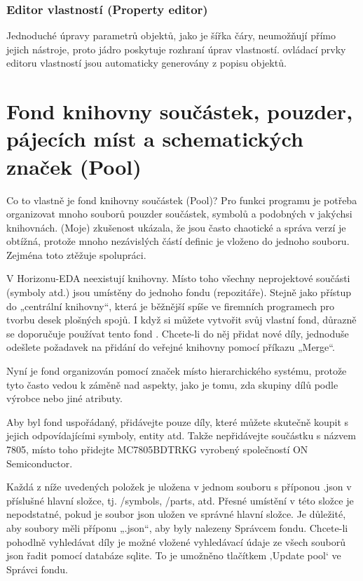 \documentclass[letterpaper,10pt,czech]{sphinxmanual}
\begin{document}
\subsection{Editor vlastností (Property editor)}
\label{\detokenize{theory-of-operation_cz:editor-vlastnosti-property-editor}}
Jednoduché úpravy parametrů objektů, jako je šířka čáry, neumožňují přímo jejich nástroje,
proto jádro poskytuje rozhraní úprav vlastností.
ovládací prvky editoru vlastností jsou automaticky generovány z popisu objektů.


\chapter{Fond knihovny součástek, pouzder, pájecích míst a schematických značek (Pool)}
\label{\detokenize{pool_cz:fond-knihovny-soucastek-pouzder-pajecich-mist-a-schematickych-znacek-pool}}\label{\detokenize{pool_cz::doc}}
Co to vlastně je fond knihovny součástek (Pool)? Pro funkci programu je potřeba organizovat mnoho souborů pouzder součástek, symbolů a podobných v jakýchsi knihovnách. (Moje) zkušenost ukázala, že jsou často chaotické a správa verzí je obtížná, protože mnoho nezávislých částí definic je vloženo do jednoho souboru. Zejména toto ztěžuje spolupráci.

V Horizonu-EDA neexistují knihovny. Místo toho všechny neprojektové součásti (symboly atd.) jsou umístěny do jednoho fondu (repozitáře). Stejně jako přístup do „centrální knihovny“, která je běžnější spíše ve firemních programech pro tvorbu desek plošných spojů. I když si můžete vytvořit svůj vlastní fond, důrazně se doporučuje používat tento fond
. Chcete-li do něj přidat nové díly, jednoduše odešlete požadavek na přidání do veřejné knihovny pomocí příkazu „Merge“.

Nyní je fond organizován pomocí značek místo hierarchického
systému, protože tyto často vedou k záměně nad aspekty, jako je tomu, zda
skupiny dílů podle výrobce nebo jiné atributy.

Aby byl fond uspořádaný, přidávejte pouze díly, které můžete skutečně koupit s jejich odpovídajícími symboly, entity atd. Takže nepřidávejte součástku s názvem 7805, místo toho přidejte MC7805BDTRKG vyrobený společností ON Semiconductor.

Každá z níže uvedených položek je uložena v jednom souboru s příponou .json v příslušné hlavní složce, tj. /symbols, /parts, atd. Přesné umístění v této složce je nepodstatné, pokud je soubor json uložen ve
správné hlavní složce. Je důležité, aby soubory měli příponu „.json“, aby byly nalezeny Správcem fondu. Chcete-li pohodlně vyhledávat díly je možné vložené vyhledávací údaje ze všech souborů json řadit pomocí databáze sqlite. To je umožněno tlačítkem ‚Update pool‘ ve Správci fondu.
\end{document}
